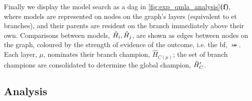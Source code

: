 Finally we display the model search as a \gls{dag} in \cref{fig:exp_qmla_analysis}\textbf{(f)}, 
    where models are represented on nodes on the graph's layers (equivalent to \gls{et} branches), 
    and their parents are resident on the branch immediately above their own.
Comparisons between models, $\hat{H}_i, \hat{H}_j$,  are shown as edges between nodes on the graph, 
    coloured by the strength of evidence of the outcome, i.e. the \acrlong{bf}, $\bij$. 
Each layer, $\mu$, nominates their branch champion, $\hat{H}_{C(\mu)}$;
    the set of branch champions are consolidated to determine the global champion, $\hat{H}^{\prime}_C$. 
\subsection{Analysis}\label{sec:exp_qmla_analysis}


